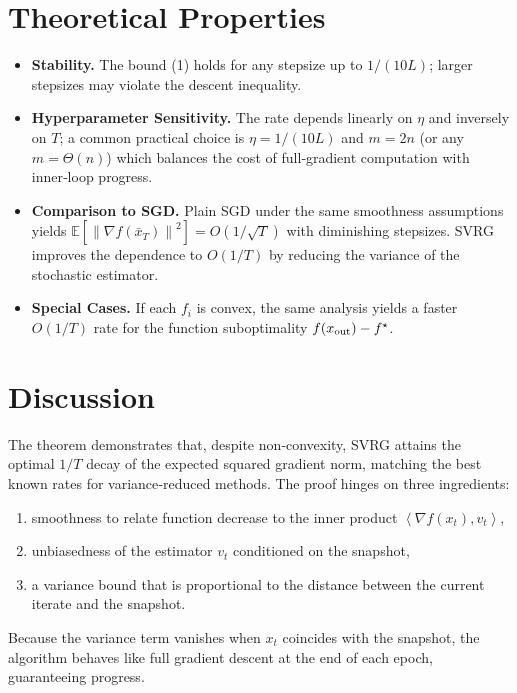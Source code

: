 \documentclass[11pt]{article}
\newcommand{\E}{\mathbb{E}}
\newcommand{\norm}[1]{\left\|#1\right\|}
\newcommand{\inner}[2]{\left\langle #1,#2 \right\rangle}
\begin{document}
\section*{Theoretical Properties}
\begin{itemize}
  \item \textbf{Stability.} The bound (1) holds for any stepsize up to $1/(10L)$; larger stepsizes may violate the descent inequality.
  \item \textbf{Hyperparameter Sensitivity.} The rate depends linearly on $\eta$ and inversely on $T$; a common practical choice is $\eta=1/(10L)$ and $m=2n$ (or any $m=\Theta(n)$) which balances the cost of full‑gradient computation with inner‑loop progress.
  \item \textbf{Comparison to SGD.} Plain SGD under the same smoothness assumptions yields $\E[\norm{\nabla f(\bar x_T)}^{2}]=O(1/\sqrt{T})$ with diminishing stepsizes. SVRG improves the dependence to $O(1/T)$ by reducing the variance of the stochastic estimator.
  \item \textbf{Special Cases.} If each $f_i$ is convex, the same analysis yields a faster $O(1/T)$ rate for the function suboptimality $f(x_{\rm out})-f^{\star}$.
\end{itemize}

\section*{Discussion}
The theorem demonstrates that, despite non‑convexity, SVRG attains the optimal $1/T$ decay of the expected squared gradient norm, matching the best known rates for variance‑reduced methods. The proof hinges on three ingredients:
\begin{enumerate}
  \item smoothness to relate function decrease to the inner product $\inner{\nabla f(x_t)}{v_t}$,
  \item unbiasedness of the estimator $v_t$ conditioned on the snapshot,
  \item a variance bound that is proportional to the distance between the current iterate and the snapshot.
\end{enumerate}
Because the variance term vanishes when $x_t$ coincides with the snapshot, the algorithm behaves like full gradient descent at the end of each epoch, guaranteeing progress.

\end{document}
